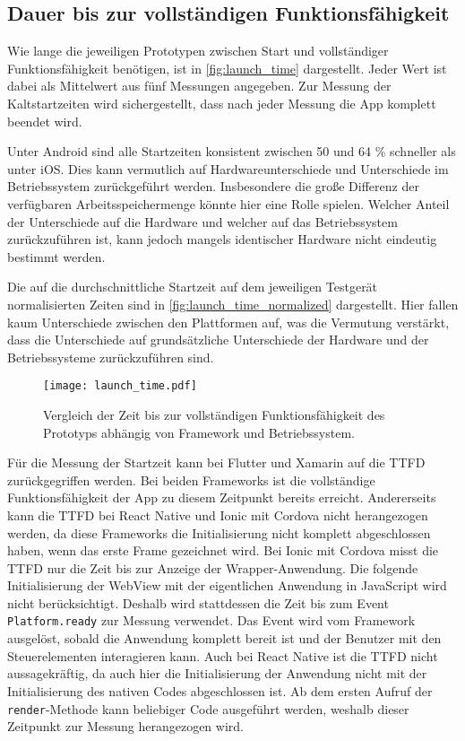 \subsection{Dauer bis zur vollständigen Funktionsfähigkeit}

Wie lange die jeweiligen Prototypen zwischen Start und vollständiger Funktionsfähigkeit benötigen, ist in \autoref{fig:launch_time} dargestellt.
Jeder Wert ist dabei als Mittelwert aus fünf Messungen angegeben.
Zur Messung der Kaltstartzeiten wird sichergestellt, dass nach jeder Messung die App komplett beendet wird.

Unter Android sind alle Startzeiten konsistent zwischen 50 und 64 \% schneller als unter iOS.
Dies kann vermutlich auf Hardwareunterschiede und Unterschiede im Betriebssystem zurückgeführt werden.
Insbesondere die große Differenz der verfügbaren Arbeitsspeichermenge könnte hier eine Rolle spielen.
Welcher Anteil der Unterschiede auf die Hardware und welcher auf das Betriebssystem zurückzuführen ist, kann jedoch mangels identischer Hardware nicht eindeutig bestimmt werden.

Die auf die durchschnittliche Startzeit auf dem jeweiligen Testgerät normalisierten Zeiten sind in \autoref{fig:launch_time_normalized} dargestellt.
Hier fallen kaum Unterschiede zwischen den Plattformen auf, was die Vermutung verstärkt, dass die Unterschiede auf grundsätzliche Unterschiede der Hardware und der Betriebssysteme zurückzuführen sind.
\begin{figure}[ht]
  \centering 
  \texttt{[image: launch\_time.pdf]}
  \caption{Vergleich der Zeit bis zur vollständigen Funktionsfähigkeit des Prototyps abhängig von Framework und Betriebssystem.}
  \label{fig:launch_time}
\end{figure}


Für die Messung der Startzeit kann bei Flutter und Xamarin auf die \ac{TTFD} zurückgegriffen werden.
Bei beiden Frameworks ist die vollständige Funktionsfähigkeit der App zu diesem Zeitpunkt bereits erreicht.
Andererseits kann die \ac{TTFD} bei React Native und Ionic mit Cordova nicht herangezogen werden, da diese Frameworks die Initialisierung nicht komplett abgeschlossen haben, wenn das erste Frame gezeichnet wird.
Bei Ionic mit Cordova misst die \ac{TTFD} nur die Zeit bis zur Anzeige der Wrapper-Anwendung.
Die folgende Initialisierung der WebView mit der eigentlichen Anwendung in JavaScript wird nicht berücksichtigt.
Deshalb wird stattdessen die Zeit bis zum Event \texttt{Platform.ready} zur Messung verwendet.
Das Event wird vom Framework ausgelöst, sobald die Anwendung komplett bereit ist und der Benutzer mit den Steuerelementen interagieren kann.
Auch bei React Native ist die \ac{TTFD} nicht aussagekräftig, da auch hier die Initialisierung der Anwendung nicht mit der Initialisierung des nativen Codes abgeschlossen ist.
Ab dem ersten Aufruf der \texttt{render}-Methode kann beliebiger Code ausgeführt werden, weshalb dieser Zeitpunkt zur Messung herangezogen wird.

